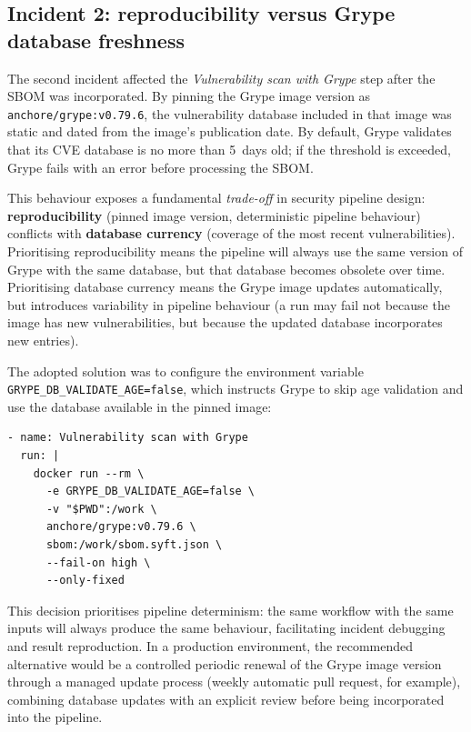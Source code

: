 \subsection{Incident 2: reproducibility versus Grype database freshness}

The second incident affected the \textit{Vulnerability scan with Grype} step after the SBOM was incorporated. By pinning the Grype image version as \texttt{anchore/grype:v0.79.6}, the vulnerability database included in that image was static and dated from the image's publication date. By default, Grype validates that its CVE database is no more than 5~days old; if the threshold is exceeded, Grype fails with an error before processing the SBOM.

This behaviour exposes a fundamental \textit{trade-off} in security pipeline design: \textbf{reproducibility} (pinned image version, deterministic pipeline behaviour) conflicts with \textbf{database currency} (coverage of the most recent vulnerabilities). Prioritising reproducibility means the pipeline will always use the same version of Grype with the same database, but that database becomes obsolete over time. Prioritising database currency means the Grype image updates automatically, but introduces variability in pipeline behaviour (a run may fail not because the image has new vulnerabilities, but because the updated database incorporates new entries).

The adopted solution was to configure the environment variable \texttt{GRYPE\_DB\_VALIDATE\_AGE=false}, which instructs Grype to skip age validation and use the database available in the pinned image:

\begin{lstlisting}
- name: Vulnerability scan with Grype
  run: |
    docker run --rm \
      -e GRYPE_DB_VALIDATE_AGE=false \
      -v "$PWD":/work \
      anchore/grype:v0.79.6 \
      sbom:/work/sbom.syft.json \
      --fail-on high \
      --only-fixed
\end{lstlisting}

This decision prioritises pipeline determinism: the same workflow with the same inputs will always produce the same behaviour, facilitating incident debugging and result reproduction. In a production environment, the recommended alternative would be a controlled periodic renewal of the Grype image version through a managed update process (weekly automatic pull request, for example), combining database updates with an explicit review before being incorporated into the pipeline.


